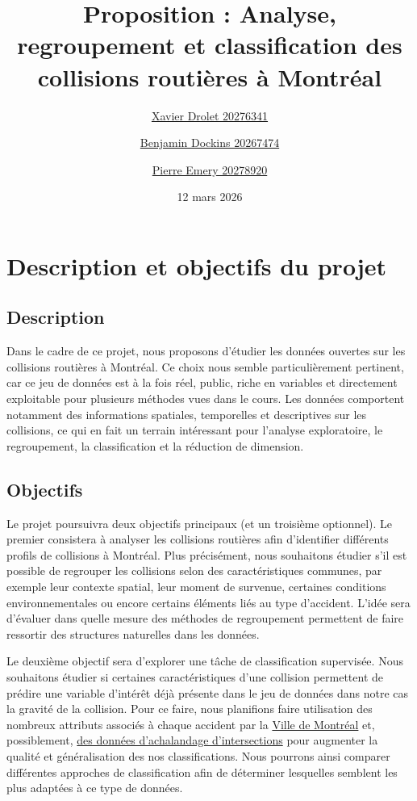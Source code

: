 \documentclass[10pt]{article}
\title{Proposition : Analyse, regroupement et classification des collisions routières à Montréal}
\author{
\href{mailto:xavier.drolet.2@umontreal.ca}{Xavier Drolet 20276341}
\and
\href{mailto:benjamin.dockins@umontreal.ca}{Benjamin Dockins 20267474}
\and
\href{mailto:pierre.emery@umontreal.ca}{Pierre Emery 20278920}
}
\date{12 mars 2026}
\begin{document}
\maketitle

\section{Description et objectifs du projet}

\subsection{Description}
Dans le cadre de ce projet, nous proposons d’étudier les données ouvertes sur les collisions routières à Montréal. Ce choix nous semble particulièrement pertinent, car ce jeu de données est à la fois réel, public, riche en variables et directement exploitable pour plusieurs méthodes vues dans le cours. Les données comportent notamment des informations spatiales, temporelles et descriptives sur les collisions, ce qui en fait un terrain intéressant pour l’analyse exploratoire, le regroupement, la classification et la réduction de dimension.

\subsection{Objectifs}
Le projet poursuivra deux objectifs principaux (et un troisième optionnel). Le premier consistera à analyser les collisions routières afin d’identifier différents profils de collisions à Montréal. Plus précisément, nous souhaitons étudier s’il est possible de regrouper les collisions selon des caractéristiques communes, par exemple leur contexte spatial, leur moment de survenue, certaines conditions environnementales ou encore certains éléments liés au type d’accident. L’idée sera d’évaluer dans quelle mesure des méthodes de regroupement permettent de faire ressortir des structures naturelles dans les données.

Le deuxième objectif sera d’explorer une tâche de classification supervisée. Nous souhaitons étudier si certaines caractéristiques d’une collision permettent de prédire une variable d’intérêt déjà présente dans le jeu de données dans notre cas la gravité de la collision. Pour ce faire, nous planifions faire utilisation des nombreux attributs associés à chaque accident par la \href{https://donnees.montreal.ca/dataset/collisions-routieres#methodology}{Ville de Montréal} et, possiblement, \href{https://donnees.montreal.ca/dataset/comptage-vehicules-pietons}{des données d'achalandage d'intersections} pour augmenter la qualité et généralisation des nos classifications. Nous pourrons ainsi comparer différentes approches de classification afin de déterminer lesquelles semblent les plus adaptées à ce type de données.
\end{document}
